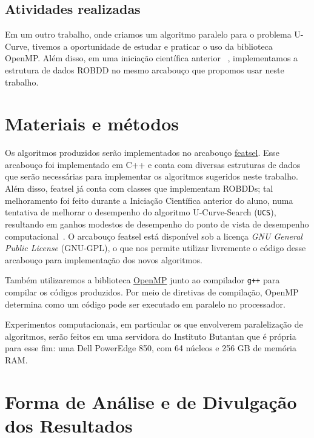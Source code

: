 \documentclass[12pt]{article}
\begin{document}
\subsection{Atividades realizadas}
Em um outro trabalho, onde criamos um algoritmo paralelo para o problema
U-Curve, tivemos a oportunidade de estudar e praticar o uso da 
biblioteca OpenMP. Além disso, em uma iniciação científica anterior 
~\cite{ucsrobdd ic}, implementamos a estrutura de dados ROBDD no mesmo
arcabouço que propomos usar neste trabalho.

\section{Materiais e métodos}
Os algoritmos produzidos serão implementados no arcabouço 
\href{https://github.com/msreis/featsel}{featsel}. Esse arcabouço foi 
implementado em C++ e conta com diversas estruturas de dados que serão
necessárias para implementar os algoritmos sugeridos neste trabalho.
Além disso, featsel já conta com classes que implementam ROBDDs; tal
melhoramento foi feito durante a Iniciação Científica anterior do
aluno, numa tentativa de melhorar o desempenho do algoritmo
U-Curve-Search ({\tt UCS}), resultando em ganhos modestos de desempenho
do ponto de vista de desempenho computacional~\cite{ucsrobdd ic}.
O arcabouço featsel está disponível sob a licença \textit{GNU General
Public License} (GNU-GPL), o que nos permite utilizar livremente o
código desse arcabouço para implementação dos novos algoritmos. 

Também utilizaremos a biblioteca \href{http://www.openmp.org/}{OpenMP}
junto ao compilador {\tt g++} para compilar os códigos produzidos.
Por meio de diretivas de compilação, OpenMP determina como um código
pode ser executado em paralelo no processador.

Experimentos computacionais, em particular os que envolverem 
paralelização de algoritmos, serão feitos em uma servidora do Instituto
Butantan que é própria para esse fim: uma Dell PowerEdge 850, com 64 
núcleos e 256 GB de memória RAM.


\section{Forma de Análise e de Divulgação dos Resultados}
\end{document}
